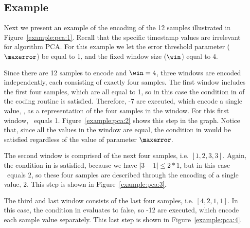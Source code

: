 \clearpage




\subsection{Example}
\label{algo:pca:example}
\newcommand{\exampleRecallIrrelevant}[1]{Recall that the specific timestamp values are irrelevant for algorithm #1}


Next we present an example of the encoding of the 12 samples illustrated in Figure~\ref{example:pca:1}. \exampleRecallIrrelevant{PCA}. For this example we let the error threshold parameter ($\maxerror$) be equal to 1, and the fixed window size ($\win$) equal to 4.


\vspace{+5pt}


Since there are 12 samples to encode and $\win=4$, three windows are encoded independently, each consisting of exactly four samples. The first window includes the first four samples, which are all equal to 1, so in this case the condition in  of the coding routine is satisfied. Therefore, -7 are executed, which encode a single value, \midrange, as a representation of the four samples in the window. For this first window, \midrange\ equals 1. Figure~\ref{example:pca:2} shows this step in the graph. Notice that, since all the values in the window are equal, the condition in  would be satisfied regardless of the value of parameter $\maxerror$.


\vspace{+5pt}


\clearpage


The second window is comprised of the next four samples, i.e. $[1, 2, 3, 3]$. Again, the condition in  is satisfied, because we have $|3 - 1| \leq 2*1$, but in this case \midrange\ equals 2, so these four samples are described through the encoding of a single value, 2. This step is shown in Figure~\ref{example:pca:3}.




The third and last window consists of the last four samples, i.e. $[4, 2, 1, 1]$. In this case, the condition in  evaluates to false, so -12 are executed, which encode each sample value separately. This last step is shown in Figure~\ref{example:pca:4}.


